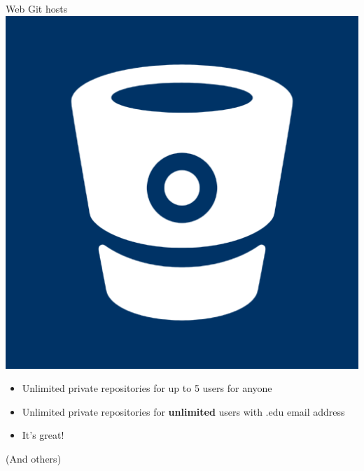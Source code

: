 \documentclass[xcolor=dvipsnames]{beamer}
\begin{document}
\begin{frame}{Web Git hosts}
\vspace{5mm}
\includegraphics[scale=.03]{bitbucketlogo} \hspace{1mm}{\LARGE Bitbucket}
\begin{itemize}
\item Unlimited private repositories for up to 5 users for anyone
\item Unlimited private repositories for {\bf unlimited} users with .edu email address
\item It's great!
\end{itemize}

\vspace{3mm}
(And others)
\end{frame}
\end{document}
